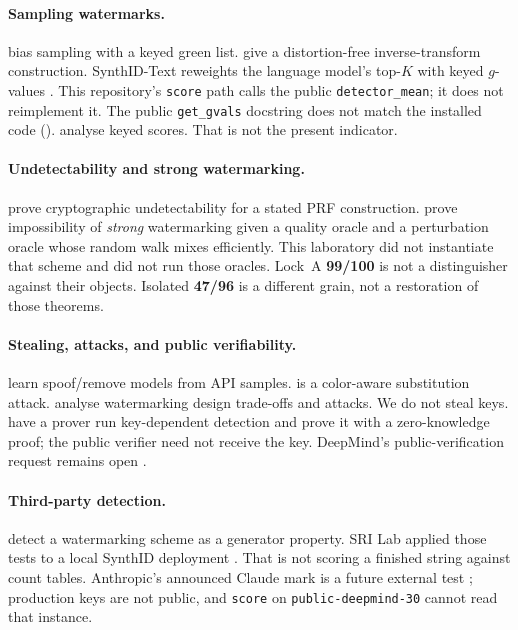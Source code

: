 \documentclass[11pt,a4paper]{article}
\theoremstyle{definition}
\newcommand{\Ktop}{K}
\begin{document}
\paragraph{Sampling watermarks.}
\citet{kirchenbauer2023watermark} bias sampling with a keyed green list.
\citet{kuditipudi2024robust} give a distortion-free inverse-transform
construction. SynthID-Text reweights the language model's top-$\Ktop$
with keyed $g$-values \citep{dathathri2024synthid}. This repository's
\texttt{score} path calls the public \texttt{detector\_mean}; it does
not reimplement it. The public \texttt{get\_gvals} docstring does not
match the installed code (). \citet{omidi2026synthid}
analyse keyed scores. That is not the present indicator.

\paragraph{Undetectability and strong watermarking.}
\citet{christ2024undetectable} prove cryptographic undetectability for a
stated PRF construction. \citet{zhang2024sand} prove impossibility of
\emph{strong} watermarking given a quality oracle and a perturbation
oracle whose random walk mixes efficiently.
This laboratory did not instantiate that scheme and did not run those
oracles. Lock~A \textbf{99/100} is not a distinguisher against their
objects. Isolated \textbf{47/96} is a different grain, not a restoration
of those theorems.

\paragraph{Stealing, attacks, and public verifiability.}
\citet{jovanovic2024stealing} learn spoof/remove models from API
samples. \citet{wu2024bypassing} is a color-aware substitution attack.
\citet{pang2024nfl} analyse watermarking design trade-offs and attacks.
We do not steal keys. \citet{duan2025pvmark} have a prover run
key-dependent detection and prove it with a zero-knowledge proof; the
public verifier need not receive the key. DeepMind's public-verification
request remains open \citep{deepmind2024issue22}.

\paragraph{Third-party detection.}
\citet{gloaguen2025blackbox} detect a watermarking scheme as a generator
property. SRI Lab applied those tests to a local SynthID deployment
\citep{gloaguen2024probingsynthid}. That is not scoring a finished
string against count tables. Anthropic's announced Claude mark is a
future external test \citep{anthropic2026watermarknews}; production
keys are not public, and \texttt{score} on \texttt{public-deepmind-30}
cannot read that instance.
\end{document}
